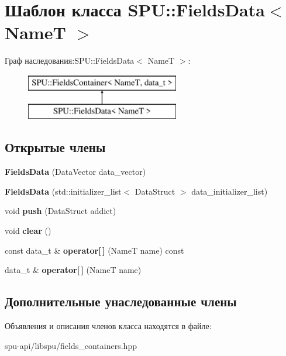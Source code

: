 \hypertarget{class_s_p_u_1_1_fields_data}{}\section{Шаблон класса S\+PU\+:\+:Fields\+Data$<$ NameT $>$}
\label{class_s_p_u_1_1_fields_data}
Граф наследования\+:S\+PU\+:\+:Fields\+Data$<$ NameT $>$\+:\begin{figure}[H]
\begin{center}
\leavevmode
\includegraphics[height=2.000000cm]{class_s_p_u_1_1_fields_data}
\end{center}
\end{figure}
\subsection*{Открытые члены}
\begin{DoxyCompactItemize}
\item 
\mbox{\label{class_s_p_u_1_1_fields_data_af5172a9b8709116bb462e23d10364073}} 
{\bfseries Fields\+Data} (Data\+Vector data\+\_\+vector)
\item 
\mbox{\label{class_s_p_u_1_1_fields_data_adb00b20681dd5a4142c47fc2386be31b}} 
{\bfseries Fields\+Data} (std\+::initializer\+\_\+list$<$ Data\+Struct $>$ data\+\_\+initializer\+\_\+list)
\item 
\mbox{\label{class_s_p_u_1_1_fields_data_ae5b05f68095703c025a0a0fdfa3d1551}} 
void {\bfseries push} (Data\+Struct addict)
\item 
\mbox{\label{class_s_p_u_1_1_fields_data_a11e983c717748422fec0e0f20e9e261a}} 
void {\bfseries clear} ()
\item 
\mbox{\label{class_s_p_u_1_1_fields_data_a1e1ec859160534ae5a52654295cf609a}} 
const data\+\_\+t \& {\bfseries operator\mbox{[}$\,$\mbox{]}} (NameT name) const
\item 
\mbox{\label{class_s_p_u_1_1_fields_data_a75a20498b05f5e29f8834878b0c080cf}} 
data\+\_\+t \& {\bfseries operator\mbox{[}$\,$\mbox{]}} (NameT name)
\end{DoxyCompactItemize}
\subsection*{Дополнительные унаследованные члены}


Объявления и описания членов класса находятся в файле\+:\begin{DoxyCompactItemize}
\item 
spu-\/api/libspu/fields\+\_\+containers.\+hpp\end{DoxyCompactItemize}

